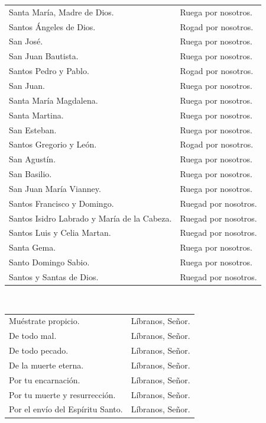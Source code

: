 \documentclass[12pt, letterpaper]{report}
\begin{document}
\begin{tabular}{ll}
Santa Mar\'ia, Madre de Dios.& Ruega por nosotros. \\
Santos \'Angeles de Dios.& Rogad por nosotros. \\
San Jos\'e.& Ruega por nosotros. \\
San Juan Bautista.& Ruega por nosotros. \\
Santos Pedro y Pablo.& Rogad por nosotros. \\
San Juan.& Ruega por nosotros. \\
Santa Mar\'ia Magdalena.& Ruega por nosotros. \\
Santa Martina.& Ruega por nosotros. \\
San Esteban.& Ruega por nosotros. \\
Santos Gregorio y Le\'on.& Rogad por nosotros. \\
San Agust\'in.& Ruega por nosotros. \\
San Basilio.& Ruega por nosotros. \\
San Juan Mar\'ia Vianney.& Ruega por nosotros. \\
Santos Francisco y Domingo.& Ruegad por nosotros. \\
Santos Isidro Labrado y Mar\'ia de la Cabeza.& Ruegad por nosotros. \\
Santos Luis y Celia Martan.& Ruegad por nosotros. \\
Santa Gema.& Ruega por nosotros. \\
Santo Domingo Sabio.& Ruega por nosotros. \\
Santos y Santas de Dios.& Ruegad por nosotros.
\end{tabular} \newline \\

\begin{tabular}{ll}
Mu\'estrate propicio.& L\'ibranos, Se\~nor. \\
De todo mal.& L\'ibranos, Se\~nor. \\
De todo pecado.& L\'ibranos, Se\~nor. \\
De la muerte eterna.& L\'ibranos, Se\~nor. \\
Por tu encarnaci\'on.& L\'ibranos, Se\~nor. \\
Por tu muerte y resurrecci\'on.& L\'ibranos, Se\~nor. \\
Por el env\'io del Esp\'iritu Santo.& L\'ibranos, Se\~nor.
\end{tabular} \newline \\
\end{document}
